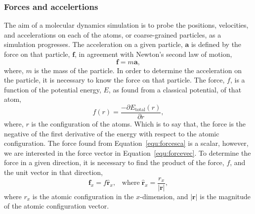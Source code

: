 \subsubsection{Forces and accelertions}
The aim of a molecular dynamics simulation is to probe the positions, velocities, and accelerations on each of the atoms, or coarse-grained particles, as a simulation progresses.
The acceleration on a given particle, $\mathbf{a}$ is defined by the force on that particle, $\mathbf{f}$, in agreement with Newton's second law of motion,
%
\begin{equation}
\mathbf{f} = m\mathbf{a},
\label{equ:forcevec}
\end{equation}
%
where, $m$ is the mass of the particle.
In order to determine the acceleration on the particle, it is necessary to know the force on that particle.
The force, $f$, is a function of the potential energy, $E$, as found from a classical potential, of that atom,
%
\begin{equation}
f(r) = \frac{-\partial E_{\text{total}}(r)}{\partial r},
\label{equ:forcesca}
\end{equation}
%
where, $r$ is the configuration of the atoms.
Which is to say that, the force is the negative of the first derivative of the energy with respect to the atomic configuration.
The force found from Equation~\ref{equ:forcesca} is a scalar, however, we are interested in the force vector in Equation~\ref{equ:forcevec}.
To determine the force in a given direction, it is necessary to find the product of the force, $f$, and the unit vector in that direction,
%
\begin{equation}
\mathbf{f}_x = f\hat{\mathbf{r}}_x, \;\;\;\text{where}\;\hat{\mathbf{r}}_x = \frac{r_x}{|\mathbf{r}|},
\end{equation}
%
where $r_x$ is the atomic configuration in the $x$-dimension, and $|\mathbf{r}|$ is the magnitude of the atomic configuration vector.

